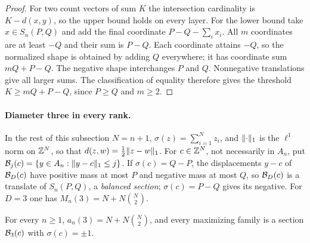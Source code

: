 \begin{proof}
For two count vectors of sum $K$ the intersection cardinality is $K-d(x,y)$, so the
upper bound holds on every layer. For the lower bound take $x\in S_n(P,Q)$ and add the
final coordinate $P-Q-\sum_ix_i$. All $m$ coordinates are at least $-Q$ and their sum is
$P-Q$. Each coordinate attains $-Q$, so the normalized shape is obtained by adding $Q$
everywhere; it has coordinate sum $mQ+P-Q$. The negative shape interchanges $P$ and $Q$.
Nonnegative translations give all larger sums. The classification of equality therefore
gives the threshold $K\ge mQ+P-Q$, since $P\ge Q$ and $m\ge2$.
\end{proof}

\paragraph{Diameter three in every rank.}
In the rest of this subsection $N=n+1$, $\sigma(z)=\sum_{i=1}^Nz_i$, and $\lVert\cdot\rVert_1$ is
the $\ell^1$ norm on $\mathbb{Z}^N$, so that $d(z,w)=\frac12\lVert z-w\rVert_1$. For $c\in\mathbb{Z}^N$, not
necessarily in $A_n$, put $\mathcal{B}_j(c)=\{y\in A_n:\lVert y-c\rVert_1\le j\}$. If
$\sigma(c)=Q-P$, the displacements $y-c$ of $\mathcal{B}_D(c)$ have positive mass at most $P$ and
negative mass at most $Q$, so $\mathcal{B}_D(c)$ is a translate of $S_n(P,Q)$, a \emph{balanced
section}; $\sigma(c)=P-Q$ gives its negative. For $D=3$ one has
$M_n(3)=N+N\binom N2$.

\begin{theorem}\label{gpp:thm:diamthree}
For every $n\ge1$, $a_n(3)=N+N\binom N2$, and every maximizing family is a section
$\mathcal{B}_3(c)$ with $\sigma(c)=\pm1$.
\end{theorem}

